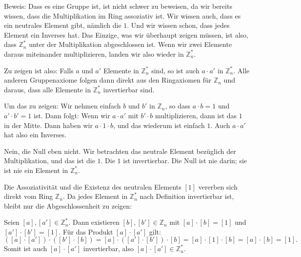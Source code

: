 \begin{spoken-clean}[00:36:26 - 00:39:41]
Beweis: Dass es eine Gruppe ist, ist nicht schwer zu beweisen, da wir bereits wissen, dass die Multiplikation im Ring assoziativ ist. Wir wissen auch, dass es ein neutrales Element gibt, nämlich die $1$. Und wir wissen schon, dass jedes Element ein Inverses hat. Das Einzige, was wir überhaupt zeigen müssen, ist also, dass $\mathbb{Z}_n^*$ unter der Multiplikation abgeschlossen ist. Wenn wir zwei Elemente daraus miteinander multiplizieren, landen wir also wieder in $\mathbb{Z}_n^*$.

Zu zeigen ist also: Falls $a$ und $a'$ Elemente in $\mathbb{Z}_n^*$ sind, so ist auch $a \cdot a'$ in $\mathbb{Z}_n^*$. Alle anderen Gruppenaxiome folgen dann direkt aus den Ringaxiomen für $\mathbb{Z}_n$ und daraus, dass alle Elemente in $\mathbb{Z}_n^*$ invertierbar sind.

Um das zu zeigen: Wir nehmen einfach $b$ und $b'$ in $\mathbb{Z}_n$, so dass $a \cdot b = 1$ und $a' \cdot b' = 1$ ist. Dann folgt: Wenn wir $a \cdot a'$ mit $b' \cdot b$ multiplizieren, dann ist das $1$ in der Mitte. Dann haben wir $a \cdot 1 \cdot b$, und das wiederum ist einfach $1$. Auch $a \cdot a'$ hat also ein Inverses.

Nein, die Null eben nicht. Wir betrachten das neutrale Element bezüglich der Multiplikation, und das ist die $1$. Die $1$ ist invertierbar. Die Null ist nie darin; sie ist nie ein Element in $\mathbb{Z}_n^*$.
\end{spoken-clean}

\begin{math-stroke}
\begin{short-proof}
Die Assoziativität und die Existenz des neutralen Elements $[1]$ vererben sich direkt vom Ring $\mathbb{Z}_n$. Da jedes Element in $\mathbb{Z}_n^*$ nach Definition invertierbar ist, bleibt nur die Abgeschlossenheit zu zeigen:

Seien $[a], [a'] \in \mathbb{Z}_n^*$. Dann existieren $[b], [b'] \in \mathbb{Z}_n$ mit $[a] \cdot [b] = [1]$ und $[a'] \cdot [b'] = [1]$. Für das Produkt $[a] \cdot [a']$ gilt:
\[
([a] \cdot [a']) \cdot ([b'] \cdot [b]) = [a] \cdot ([a'] \cdot [b']) \cdot [b] = [a] \cdot [1] \cdot [b] = [a] \cdot [b] = [1].
\]
Somit ist auch $[a] \cdot [a']$ invertierbar, also $[a] \cdot [a'] \in \mathbb{Z}_n^*$.
\end{short-proof}
\end{math-stroke}

